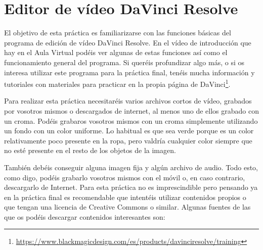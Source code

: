\documentclass[es,practica]{uah}
\begin{document}

\maketitle



\section{Editor de vídeo DaVinci Resolve}


El objetivo de esta práctica es familiarizarse con las funciones básicas del programa de edición de vídeo DaVinci Resolve. En el vídeo de introducción que hay en el Aula Virtual podéis ver algunas de estas funciones así como el funcionamiento general del programa. Si queréis profundizar algo más, o si os interesa utilizar este programa para la práctica final, tenéis mucha información y tutoriales con materiales para practicar en la propia página de DaVinci\footnote{\url{https://www.blackmagicdesign.com/es/products/davinciresolve/training}}.

Para realizar esta práctica necesitaréis varios archivos cortos de vídeo, grabados por vosotros mismos o descargados de internet, al menos uno de ellos grabado con un croma. Podéis grabaros vosotros mismos con un croma simplemente utilizando un fondo con un color uniforme. Lo habitual es que sea verde porque es un color relativamente poco presente en la ropa, pero valdría cualquier color siempre que no esté presente en el resto de los objetos de la imagen. 

También debéis conseguir alguna imagen fija y algún archivo de audio. Todo esto, como digo, podéis grabarlo vosotros mismos con el móvil o, en caso contrario, descargarlo de Internet. Para esta práctica no es imprescindible pero pensando ya en la práctica final es recomendable que intentéis utilizar contenidos propios o que tengan una licencia de Creative Commons o similar. Algunas fuentes de las que os podéis descargar contenidos interesantes son: 
\end{document}
